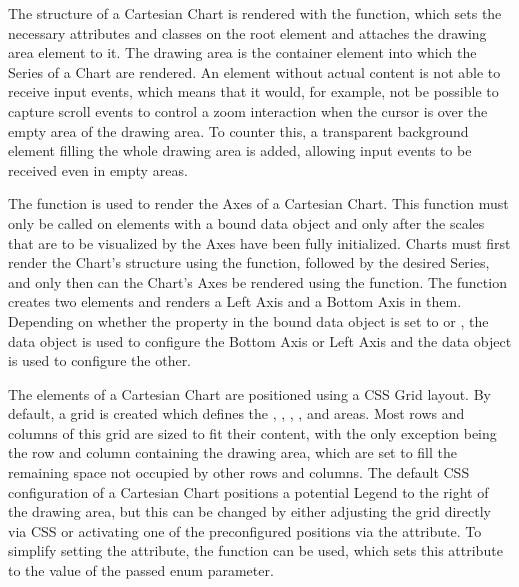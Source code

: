 The structure of a Cartesian Chart is rendered with the
 function, which sets the necessary
attributes and classes on the root element and attaches the drawing area
 element to it. The drawing area is the container element
into which the Series of a Chart are rendered. An 
element without actual content is not able to receive input events,
which means that it would, for example, not be possible to capture
scroll events to control a zoom interaction when the cursor is over
the empty area of the drawing area. To counter this, a transparent
 background element filling the whole drawing area is
added, allowing input events to be received even in empty areas.

The  function is used to render the
Axes of a Cartesian Chart. This function must only be called on
elements with a bound  data object and only after
the scales that are to be visualized by the Axes have been fully
initialized. Charts must first render the Chart's structure using the
 function, followed by the desired Series,
and only then can the Chart's Axes be rendered using the
 function. The
 function creates two 
elements and renders a Left Axis and a Bottom Axis in them. Depending
on whether the  property in the bound data object is set
to  or , the  data object is used
to configure the Bottom Axis or Left Axis and the  data
object is used to configure the other. 

The elements of a Cartesian Chart are positioned using a CSS Grid
layout. By default, a grid is created which defines the ,
, , , and
 areas. Most rows and columns of this grid are sized to
fit their content, with the only exception being the row and column
containing the drawing area, which are set to fill the remaining space
not occupied by other rows and columns. The default CSS configuration
of a Cartesian Chart positions a potential Legend to the right of the
drawing area, but this can be changed by either adjusting the grid
directly via CSS or activating one of the preconfigured positions via
the  attribute. To simplify setting the
 attribute, the
 function can be used, which sets this
attribute to the value of the passed  enum
parameter.






